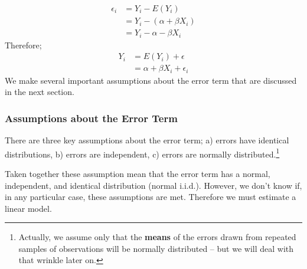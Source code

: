 \documentclass[11pt,openany]{book}\usepackage[]{graphicx}\usepackage[]{color}
\begin{document}
\begin{align*}
\epsilon_i &= Y_{i}-E(Y_{i}) \\
&= Y_{i}-(\alpha+\beta X_{i}) \\
&= Y_{i}-\alpha-\beta X_{i}
\end{align*}
Therefore;
\begin{align*}
Y_{i} &= E(Y_{i})+\epsilon \\
&= \alpha+\beta X_{i}+\epsilon_{i} 
\end{align*}
\noindent We make several important assumptions about the error term that are discussed in the next section. 

\subsubsection{Assumptions about the Error Term} 

There are three key assumptions about the error term; a) errors have identical distributions, b) errors are independent, c) errors are normally distributed.\footnote{Actually, we assume only that the \textbf{means} of the errors drawn from repeated samples of observations will be normally distributed -- but we will deal with that wrinkle later on.}

\begin{grbox}
\end{grbox}

Taken together these assumption mean that the error term has a normal, independent, and identical distribution (normal i.i.d.). However, we don't know if, in any particular case, these assumptions are met. Therefore we must estimate a linear model. 
\end{document}
